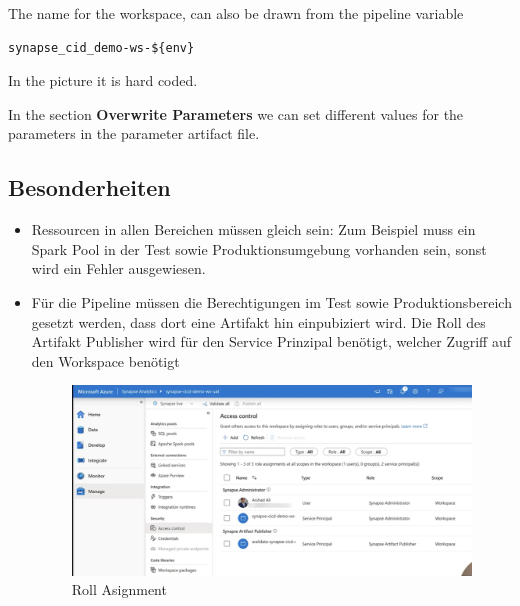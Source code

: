 The name for the workspace, can also be drawn from the pipeline variable
\begin{lstlisting}[style=CMD]
	synapse_cid_demo-ws-${env}	
\end{lstlisting}
In the picture it is hard coded.

In the section \textbf{Overwrite Parameters} we can set different values for the parameters in the parameter artifact file.


\subsection{Besonderheiten}
\begin{itemize}
	\item Ressourcen in allen Bereichen müssen gleich sein: Zum Beispiel muss ein Spark Pool in der Test sowie Produktionsumgebung vorhanden sein, sonst wird ein Fehler ausgewiesen.
	\item Für die Pipeline müssen die Berechtigungen im Test sowie Produktionsbereich gesetzt werden, dass dort eine Artifakt hin einpubiziert wird. Die Roll des Artifakt Publisher wird für den Service Prinzipal benötigt, welcher Zugriff auf den Workspace benötigt
	\begin{figure}[H]
	\centering
	\includegraphics[scale = 0.2]{attachment/chapter_2/Scc162}
	\caption{Roll Asignment}
\end{figure}
\end{itemize}
